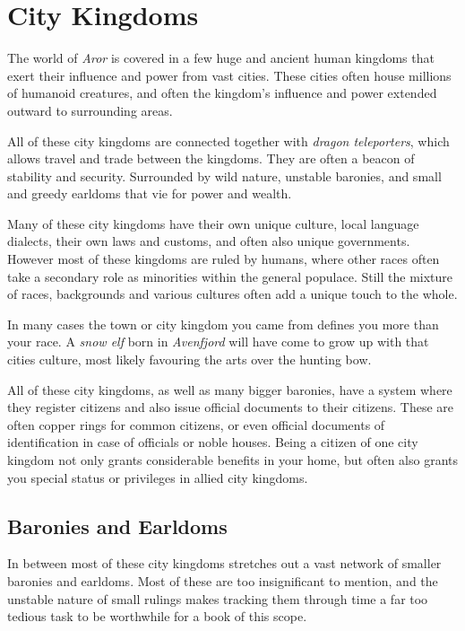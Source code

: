 \section*{City Kingdoms}

The world of \emph{Aror} is covered in a few huge and ancient human kingdoms
that exert their influence and power from vast cities. These cities often house
millions of humanoid creatures, and often the kingdom's influence and power
extended outward to surrounding areas.

All of these city kingdoms are connected together with \emph{dragon
  teleporters}, which allows travel and trade between the kingdoms. They are
often a beacon of stability and security. Surrounded by wild nature, unstable
baronies, and small and greedy earldoms that vie for power and wealth.

Many of these city kingdoms have their own unique culture, local language
dialects, their own laws and customs, and often also unique governments. However
most of these kingdoms are ruled by humans, where other races often take a
secondary role as minorities within the general populace. Still the mixture
of races, backgrounds and various cultures often add a unique touch to the
whole.

In many cases the town or city kingdom you came from defines you more than
your race. A \emph{snow elf} born in \emph{Avenfjord} will have come to grow
up with that cities culture, most likely favouring the arts over the hunting
bow.

All of these city kingdoms, as well as many bigger baronies, have a system
where they register citizens and also issue official documents to their
citizens. These are often copper rings for common citizens, or even official
documents of identification in case of officials or noble houses. Being a
citizen of one city kingdom not only grants considerable benefits in your
home, but often also grants you special status or privileges in allied city
kingdoms.

\subsection*{Baronies and Earldoms}

In between most of these city kingdoms stretches out a vast network of smaller
baronies and earldoms. Most of these are too insignificant to mention, and the
unstable nature of small rulings makes tracking them through time a far too
tedious task to be worthwhile for a book of this scope.

